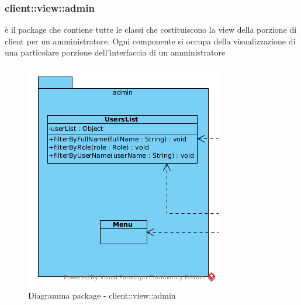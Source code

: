 \subsubsection{client::view::admin}
è il package che contiene tutte le classi che costituiscono la view della porzione di client per un amministratore. Ogni componente si occupa della visualizzazione di una particolare porzione dell'interfaccia di un amministratore\begin{center}
		\begin{figure}[H]
			\centering \includegraphics[scale=4, max width=\textwidth, max height=\myheight]{../img/diagrammiClassi/client/view/admin.png}
			\caption{Diagramma package - client::view::admin}
		\end{figure}
	\end{center}\hypertarget{client::view::admin::UsersList}{}
